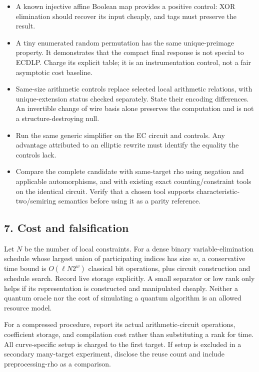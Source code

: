 \documentclass[
  10pt,
]{article}
\providecommand{\tightlist}{%
  \setlength{\itemsep}{0pt}\setlength{\parskip}{0pt}}
\begin{document}
\begin{itemize}
\tightlist
\item
  A known injective affine Boolean map provides a positive control: XOR
  elimination should recover its input cheaply, and tags must preserve
  the result.
\item
  A tiny enumerated random permutation has the same unique-preimage
  property. It demonstrates that the compact final response is not
  special to ECDLP. Charge its explicit table; it is an instrumentation
  control, not a fair asymptotic cost baseline.
\item
  Same-size arithmetic controls replace selected local arithmetic
  relations, with unique-extension status checked separately. State
  their encoding differences. An invertible change of wire basis alone
  preserves the computation and is not a structure-destroying null.
\item
  Run the same generic simplifier on the EC circuit and controls. Any
  advantage attributed to an elliptic rewrite must identify the equality
  the controls lack.
\item
  Compare the complete candidate with same-target rho using negation and
  applicable automorphisms, and with existing exact counting/constraint
  tools on the identical circuit. Verify that a chosen tool supports
  characteristic-two/semiring semantics before using it as a parity
  reference.
\end{itemize}

\subsection{7. Cost and falsification}\label{cost-and-falsification}

Let \(N\) be the number of local constraints. For a dense binary
variable-elimination schedule whose largest union of participating
indices has size \(w\), a conservative time bound is \(O(\ell N2^w)\)
classical bit operations, plus circuit construction and schedule search.
Record live storage explicitly. A small separator or low rank only helps
if its representation is constructed and manipulated cheaply. Neither a
quantum oracle nor the cost of simulating a quantum algorithm is an
allowed resource model.

For a compressed procedure, report its actual arithmetic-circuit
operations, coefficient storage, and compilation cost rather than
substituting a rank for time. All curve-specific setup is charged to the
first target. If setup is excluded in a secondary many-target
experiment, disclose the reuse count and include preprocessing-rho as a
comparison.
\end{document}
